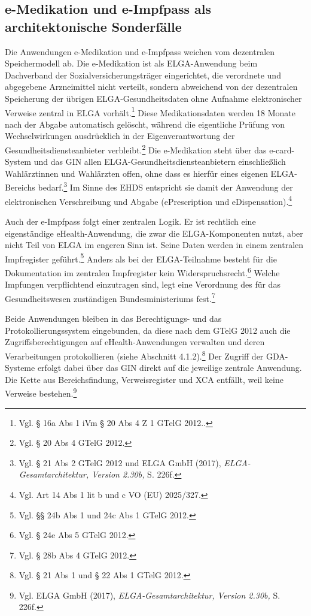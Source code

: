     \subsection{e-Medikation und e-Impfpass als architektonische Sonderfälle}
Die Anwendungen e-Medikation und e-Impfpass weichen vom dezentralen Speichermodell ab. Die e-Medikation ist als ELGA-Anwendung beim Dachverband der Sozialversicherungsträger eingerichtet, die verordnete und abgegebene Arzneimittel nicht verteilt, sondern abweichend von der dezentralen Speicherung der übrigen ELGA-Gesundheitsdaten ohne Aufnahme elektronischer Verweise zentral in ELGA vorhält.\footnote{Vgl. § 16a Abs 1 iVm § 20 Abs 4 Z 1 GTelG 2012..} Diese Medikationsdaten werden 18 Monate nach der Abgabe automatisch gelöscht, während die eigentliche Prüfung von Wechselwirkungen ausdrücklich in der Eigenverantwortung der Gesundheitsdiensteanbieter verbleibt.\footnote{Vgl. § 20 Abs 4 GTelG 2012.}
Die e-Medikation steht über das e-card-System und das GIN allen ELGA-Gesundheitsdiensteanbietern einschließlich Wahlärztinnen und Wahlärzten offen, ohne dass es hierfür eines eigenen ELGA-Bereichs bedarf.\footnote{Vgl. § 21 Abs 2 GTelG 2012 und ELGA GmbH (2017), \textit{ELGA-Gesamtarchitektur, Version 2.30b,} S. 226f.}
Im Sinne des EHDS entspricht sie damit der Anwendung der elektronischen Verschreibung und Abgabe (ePrescription und eDispensation).\footnote{Vgl. Art 14 Abs 1 lit b und c VO (EU) 2025/327.}

Auch der e-Impfpass folgt einer zentralen Logik. Er ist rechtlich eine eigenständige eHealth-Anwendung, die zwar die ELGA-Komponenten nutzt, aber nicht Teil von ELGA im engeren Sinn ist. Seine Daten werden in einem zentralen Impfregister geführt.\footnote{Vgl. §§ 24b Abs 1 und 24c Abs 1 GTelG 2012.} Anders als bei der ELGA-Teilnahme besteht für die Dokumentation im zentralen Impfregister kein Widerspruchsrecht.\footnote{Vgl. § 24e Abs 5 GTelG 2012.} Welche Impfungen verpflichtend einzutragen sind, legt eine Verordnung des für das Gesundheitswesen zuständigen Bundesministeriums fest.\footnote{Vgl. § 28b Abs 4 GTelG 2012.}

Beide Anwendungen bleiben in das Berechtigungs- und das Protokollierungssystem eingebunden, da diese nach dem GTelG 2012 auch die Zugriffsberechtigungen auf eHealth-Anwendungen verwalten und deren Verarbeitungen protokollieren (siehe Abschnitt 4.1.2).\footnote{Vgl. § 21 Abs 1 und § 22 Abs 1 GTelG 2012.} Der Zugriff der GDA-Systeme erfolgt dabei über das GIN direkt auf die jeweilige zentrale Anwendung. Die Kette aus Bereichsfindung, Verweisregister und XCA entfällt, weil keine Verweise bestehen.\footnote{Vgl. ELGA GmbH (2017), \textit{ELGA-Gesamtarchitektur, Version 2.30b,} S. 226f.}


